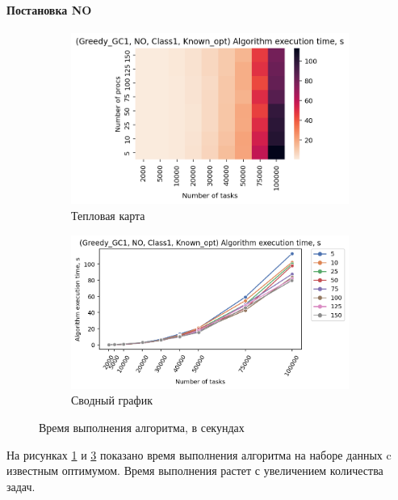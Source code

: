 \paragraph{Постановка NO}

\begin{figure}[!htbp]
    \centering
    \begin{subfigure}{0.49\textwidth}
        \includegraphics[width=\textwidth]{imgs/ideal_1/NO/et_heatmap.png}
        \caption{Тепловая карта}
        \label{fig:NO-exec-time-heatmap}
    \end{subfigure}
    \hfill
    \begin{subfigure}{0.49\textwidth}
        \includegraphics[width=\textwidth]{imgs/ideal_1/NO/tr_graph.png}
        \caption{Сводный график}
        \label{fig:NO-exec-time-compiled}
    \end{subfigure}
    \caption{Время выполнения алгоритма, в секундах}
\end{figure}

На рисунках \ref{fig:NO-exec-time-heatmap} и \ref{fig:NO-exec-time-compiled} показано время выполнения алгоритма на наборе данных c известным оптимумом. Время выполнения растет с увеличением количества задач. 

